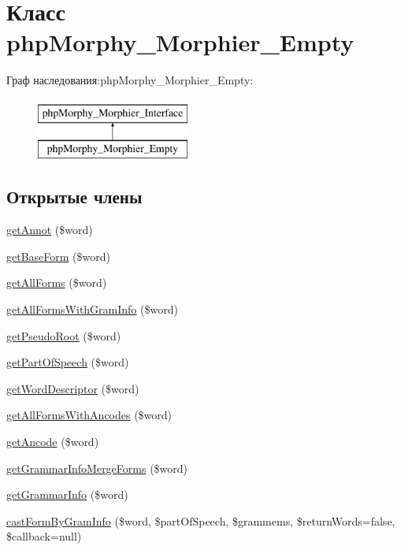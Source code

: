 \hypertarget{classphpMorphy__Morphier__Empty}{
\section{Класс phpMorphy\_\-Morphier\_\-Empty}
\label{classphpMorphy__Morphier__Empty}
}
Граф наследования:phpMorphy\_\-Morphier\_\-Empty:\begin{figure}[H]
\begin{center}
\leavevmode
\includegraphics[height=2.000000cm]{classphpMorphy__Morphier__Empty}
\end{center}
\end{figure}
\subsection*{Открытые члены}
\begin{DoxyCompactItemize}
\item 
\hyperlink{classphpMorphy__Morphier__Empty_abbe0c320c1f6d79e20430cb2cb9da275}{getAnnot} (\$word)
\item 
\hyperlink{classphpMorphy__Morphier__Empty_a179e960ebd2d0d247c6d4b0072787ded}{getBaseForm} (\$word)
\item 
\hyperlink{classphpMorphy__Morphier__Empty_aaa835a944ee2dda24855b776dacb7b20}{getAllForms} (\$word)
\item 
\hyperlink{classphpMorphy__Morphier__Empty_a86f03b1d3723719a508be47b78a96dfd}{getAllFormsWithGramInfo} (\$word)
\item 
\hyperlink{classphpMorphy__Morphier__Empty_a1233765088033fea6c9038c14613bde1}{getPseudoRoot} (\$word)
\item 
\hyperlink{classphpMorphy__Morphier__Empty_a89045a32bf993f0890de81ef4a18d76d}{getPartOfSpeech} (\$word)
\item 
\hyperlink{classphpMorphy__Morphier__Empty_a85d125dd386de4063f423db90d06b2e7}{getWordDescriptor} (\$word)
\item 
\hyperlink{classphpMorphy__Morphier__Empty_a91a2f411f5207bb2f1817b586e995ce0}{getAllFormsWithAncodes} (\$word)
\item 
\hyperlink{classphpMorphy__Morphier__Empty_add2083746d7d59678ab80e38f474379f}{getAncode} (\$word)
\item 
\hyperlink{classphpMorphy__Morphier__Empty_aa91cfe65c36e3a0b36237dca7ca9d78c}{getGrammarInfoMergeForms} (\$word)
\item 
\hyperlink{classphpMorphy__Morphier__Empty_a97b380329abdb60dde9a3faf97546065}{getGrammarInfo} (\$word)
\item 
\hyperlink{classphpMorphy__Morphier__Empty_a5672d9a5901375f25eb006b36936a23a}{castFormByGramInfo} (\$word, \$partOfSpeech, \$grammems, \$returnWords=false, \$callback=null)
\end{DoxyCompactItemize}


